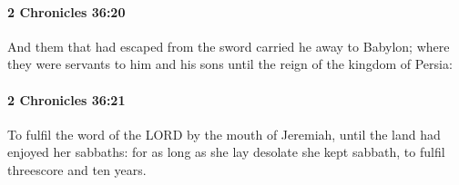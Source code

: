 		\paragraph{2 Chronicles 36:20} %
			\label{2CHRONICLES-36-20}

			And them that had escaped from the sword carried he away to Babylon; where they were servants to him and his sons until the reign of the kingdom of Persia:


		\paragraph{2 Chronicles 36:21} %
			\label{2CHRONICLES-36-21}

			To fulfil the word of the LORD by the mouth of Jeremiah, until the land had enjoyed her sabbaths: for as long as she lay desolate she kept sabbath, to fulfil threescore and ten years.



